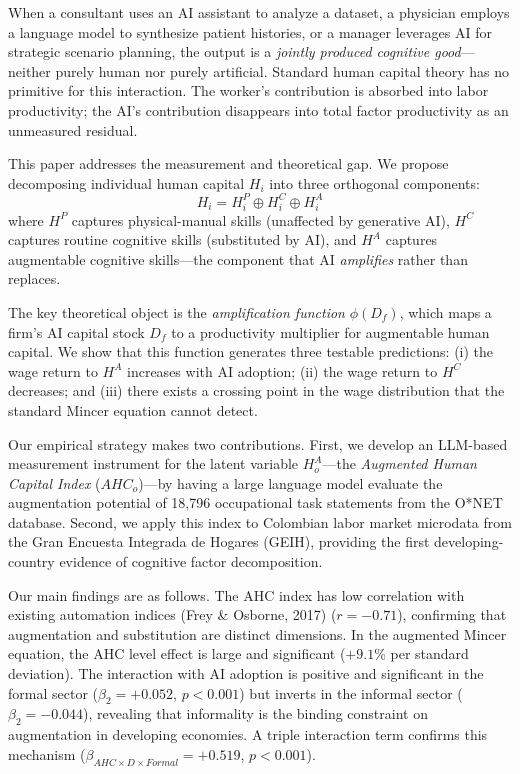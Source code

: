 \documentclass[12pt,a4paper]{article}
\begin{document}
When a consultant uses an AI assistant to analyze a dataset, a physician employs a language model to synthesize patient histories, or a manager leverages AI for strategic scenario planning, the output is a \textit{jointly produced cognitive good}---neither purely human nor purely artificial. Standard human capital theory has no primitive for this interaction. The worker's contribution is absorbed into labor productivity; the AI's contribution disappears into total factor productivity as an unmeasured residual.

This paper addresses the measurement and theoretical gap. We propose decomposing individual human capital $H_i$ into three orthogonal components:
%
\begin{equation}
H_i = H_i^P \oplus H_i^C \oplus H_i^A
\end{equation}
%
where $H^P$ captures physical-manual skills (unaffected by generative AI), $H^C$ captures routine cognitive skills (substituted by AI), and $H^A$ captures augmentable cognitive skills---the component that AI \textit{amplifies} rather than replaces.

The key theoretical object is the \textit{amplification function} $\phi(D_f)$, which maps a firm's AI capital stock $D_f$ to a productivity multiplier for augmentable human capital. We show that this function generates three testable predictions: (i) the wage return to $H^A$ increases with AI adoption; (ii) the wage return to $H^C$ decreases; and (iii) there exists a crossing point in the wage distribution that the standard Mincer equation cannot detect.

Our empirical strategy makes two contributions. First, we develop an LLM-based measurement instrument for the latent variable $H^A_o$---the \textit{Augmented Human Capital Index} ($AHC_o$)---by having a large language model evaluate the augmentation potential of 18,796 occupational task statements from the O*NET database. Second, we apply this index to Colombian labor market microdata from the Gran Encuesta Integrada de Hogares (GEIH), providing the first developing-country evidence of cognitive factor decomposition.

Our main findings are as follows. The AHC index has low correlation with existing automation indices (Frey \& Osborne, 2017) ($r = -0.71$), confirming that augmentation and substitution are distinct dimensions. In the augmented Mincer equation, the AHC level effect is large and significant ($+9.1\%$ per standard deviation). The interaction with AI adoption is positive and significant in the formal sector ($\beta_2 = +0.052$, $p < 0.001$) but inverts in the informal sector ($\beta_2 = -0.044$), revealing that informality is the binding constraint on augmentation in developing economies. A triple interaction term confirms this mechanism ($\beta_{AHC \times D \times Formal} = +0.519$, $p < 0.001$).
\end{document}
